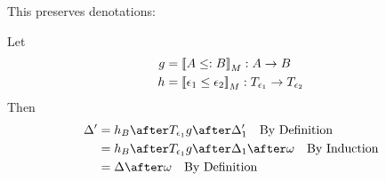 {    This preserves denotations:

    Let
    \begin{align}
        g &= {\bf [\![}A \leq: B{\bf ]\!]}_M: A \rightarrow B\\
        h &= {\bf [\![}\epsilon_1\leq\epsilon_2{\bf ]\!]}_M: T_{\epsilon_1}{}\rightarrow T_{\epsilon_2}{}
    \end{align}
    Then
    \begin{align}
        \D' & = h_B\after\T{\e_1}{g}\after \D_1' \qt{By Definition}\\
        & = h_B\after\T{\e_1}{g}\after \D_1\after\w\qt{By Induction}\\
        & = \D\after\w\qt{By Definition}
    \end{align}

}

\ifdefined\NoDocument
\else
\documentclass{report}


   \Weakening

\fi